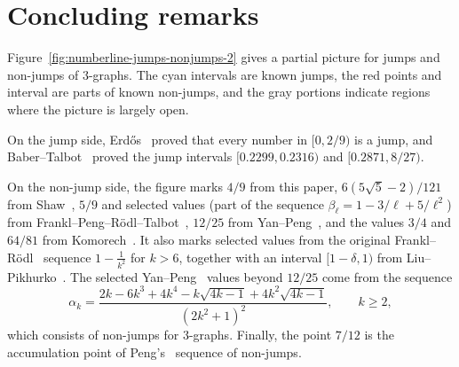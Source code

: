 \documentclass[10pt]{article}
\numberwithin{equation}{section}
\theoremstyle{definition}
\theoremstyle{remark}
\begin{document}
\section{Concluding remarks}\label{SEC:remark}
%
Figure~\ref{fig:numberline-jumps-nonjumps-2} gives a partial picture for jumps and non-jumps of $3$-graphs. The cyan intervals are known jumps, the red points and interval are parts of known non-jumps, and the gray portions indicate regions where the picture is largely open.

On the jump side, Erd\H{o}s~\cite{Erdos64} proved that every number in $[0,2/9)$ is a jump, and Baber--Talbot~\cite{BaberTalbot11} proved the jump intervals $[0.2299,0.2316)$ and $[0.2871,8/27)$.

On the non-jump side, the figure marks $4/9$ from this paper, $6(5\sqrt5-2)/121$ from Shaw~\cite{Shaw2025MinimalNonJumps}, $5/9$ and selected values (part of the sequence $\beta_\ell=1-3/\ell+5/\ell^2$) from Frankl--Peng--R\"odl--Talbot~\cite{FranklPengRodlTalbot07}, $12/25$ from Yan--Peng~\cite{YanPeng23}, and the values $3/4$ and $64/81$ from Komorech~\cite{Komorech2025NonJumps}. It also marks selected values from the original Frankl--R\"odl~\cite{FranklRodl84} sequence $1-\frac1{k^2}$ for $k>6$, together with an interval $[1-\delta,1)$ from Liu--Pikhurko~\cite{LiuPikhurkoIntervals}.
The selected Yan--Peng~\cite{YanPeng23} values beyond $12/25$ come from the sequence
\[
        \alpha_k=
        \frac{2k-6k^3+4k^4-k\sqrt{4k-1}+4k^2\sqrt{4k-1}}{(2k^2+1)^2},
        \qquad k\ge2,
\]
which consists of non-jumps for $3$-graphs. Finally, the point $7/12$ is the accumulation point of Peng's~\cite{Peng09Substructure} sequence of non-jumps.
\end{document}

